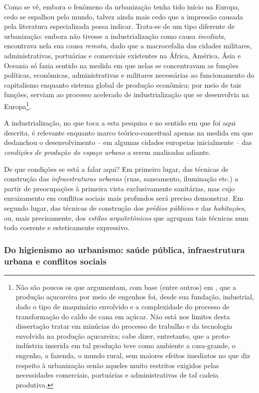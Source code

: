Como se vê, embora o fenômeno da urbanização tenha tido início na Europa, cedo se espalhou pelo mundo, talvez ainda mais cedo que a impressão causada pela literatura especializada possa indicar. Trata-se de um tipo diferente de urbanização: embora não tivesse a industrialização como causa \textit{imediata}, encontrava nela sua causa \textit{remota}, dado que a macrocefalia das cidades militares, administrativas, portuárias e comerciais existentes na África, América, Ásia e Oceania só fazia sentido na medida em que nelas se concentravam as funções políticas, econômicas, administrativas e militares necessárias ao funcionamento do capitalismo enquanto sistema global de produção econômica; por meio de tais funções, serviam ao processo acelerado de industrialização que se desenvolvia na Europa\footnote{Não são poucos os que argumentam, com base (entre outros) em , que a produção açucareira por meio de engenhos foi, desde sua fundação, industrial, dado o tipo de maquinário envolvido e a complexidade do processo de transformação do caldo de cana em açúcar. Não está nos limites desta dissertação tratar em minúcias do processo de trabalho e da tecnologia envolvida na produção açucareira; cabe dizer, entretanto, que a proto-indústria inserida em tal produção teve como ambiente a casa-grande, o engenho, a fazenda, o mundo rural, sem maiores efeitos imediatos no que diz respeito à urbanização senão aqueles muito restritos exigidos pelas necessidades comerciais, portuárias e administrativas de tal cadeia produtiva.}. 

A industrialização, no que toca a esta pesquisa e no sentido em que foi aqui descrita, é relevante enquanto marco teórico-conceitual apenas na medida em que deslanchou o desenvolvimento -- em algumas cidades europeias inicialmente -- das \textit{condições de produção do espaço urbano} a serem analisadas adiante.

De que condições se está a falar aqui? Em primeiro lugar, das técnicas de construção das \textit{infraestruturas urbanas} (ruas, saneamento, iluminação etc.) a partir de preocupações à primeira vista exclusivamente sanitárias, mas cujo enraizamento em conflitos sociais mais profundos será preciso demonstrar. Em segundo lugar, das técnicas de construção dos \textit{prédios públicos} e das \textit{habitações}, ou, mais precisamente, dos \textit{estilos arquitetônicos} que agrupam tais técnicas num todo coerente e esteticamente expressivo.

\subsubsection{Do higienismo ao urbanismo: saúde pública, infraestrutura urbana e conflitos sociais}


